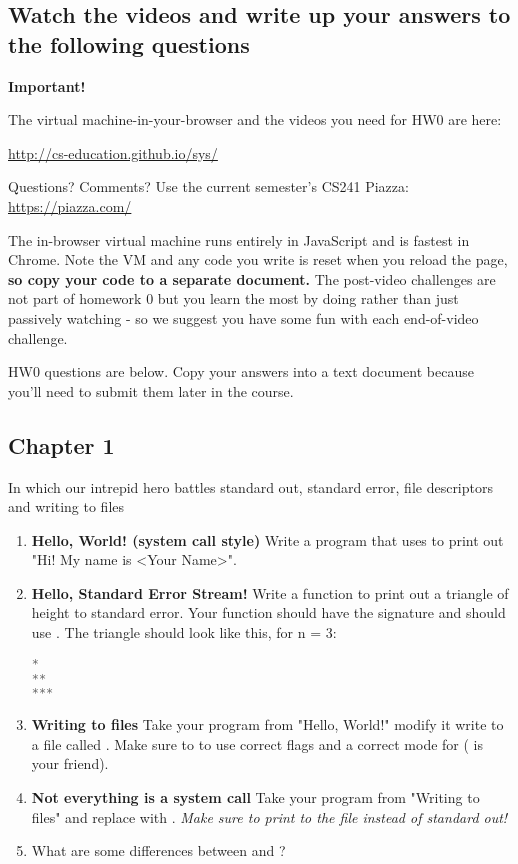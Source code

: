 \subsection{Watch the videos and write up your answers to the following questions}

\textbf{Important!}

The virtual machine-in-your-browser and the videos you need for HW0 are here:

\url{http://cs-education.github.io/sys/}

Questions? Comments? Use the current semester's CS241 Piazza:
\url{https://piazza.com/}

The in-browser virtual machine runs entirely in JavaScript and is fastest in Chrome. Note the VM and any code you write is reset when you reload the page, \textbf{so copy your code to a separate document.} The post-video challenges are not part of homework 0 but you learn the most by doing rather than just passively watching - so we suggest you have some fun with each end-of-video challenge.

HW0 questions are below. Copy your answers into a text document because you'll need to submit them later in the course.

\subsection{Chapter 1}

In which our intrepid hero battles standard out, standard error, file descriptors and writing to files

\begin{enumerate}
\item \textbf{Hello, World! (system call style)} Write a program that uses  to print out "Hi! My name is <Your Name>".
\item \textbf{Hello, Standard Error Stream!} Write a function to print out a triangle of height  to standard error.
Your function should have the signature  and should use .
The triangle should look like this, for n = 3:
\begin{lstlisting}[language=C]
*
**
***
\end{lstlisting}
\item \textbf{Writing to files} Take your program from "Hello, World!" modify it write to a file called . Make sure to to use correct flags and a correct mode for  ( is your friend).
\item \textbf{Not everything is a system call} Take your program from "Writing to files" and replace  with . \textit{Make sure to print to the file instead of standard out!}
\item What are some differences between  and ?
\end{enumerate}

